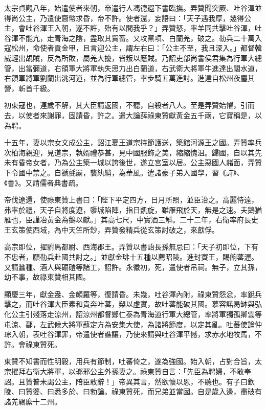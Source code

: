 \begin{pinyinscope}
 太宗貞觀八年，始遣使者來朝，帝遣行人馮德遐下書臨撫。弄贊聞突厥、吐谷渾並得尚公主，乃遣使齎幣求昏，帝不許。使者還，妄語曰：「天子遇我厚，幾得公主，會吐谷渾王入朝，遂不許，殆有以間我乎？」弄贊怒，率羊同共擊吐谷渾，吐谷渾不能亢，走青海之陰，盡取其貲畜。又攻黨項、白蘭羌，破之。勒兵二十萬入寇松州，命使者貢金甲，且言迎公主，謂左右曰：「公主不至，我且深入。」都督韓威輕出覘賊，反為所敗，屬羌大擾，皆叛以應賊。乃詔吏部尚書侯君集為行軍大總管，出當彌道，右領軍大將軍執失思力出白蘭道，右武衛大將軍牛進達出闊水道，右領軍將軍劉蘭出洮河道，並為行軍總管，率步騎五萬進討。進達自松州夜鏖其營，斬首千級。



 初東寇也，連歲不解，其大臣請返國，不聽，自殺者八人。至是弄贊始懼，引而去，以使者來謝罪，固請昏，許之。遣大論薛祿東贊獻黃金五千兩，它寶稱是，以為聘。



 十五年，妻以宗女文成公主，詔江夏王道宗持節護送，築館河源王之國。弄贊率兵次柏海親迎，見道宗，執婿禮恭甚，見中國服飾之美，縮縮愧沮。歸國，自以其先未有昏帝女者，乃為公主築一城以誇後世，遂立宮室以居。公主惡國人赭面，弄贊下令國中禁之。自褫氈罽，襲紈綃，為華風。遣諸豪子弟入國學，習《詩》、《書》。又請儒者典書疏。



 帝伐遼還，使祿東贊上書曰：「陛下平定四方，日月所照，並臣治之。高麗恃遠，弗率於禮，天子自將度遼，隳城陷陣，指日凱旋，雖雁飛於天，無是之速。夫鵝猶雁也，臣謹冶黃金為鵝以獻。」其高七尺，中實酒三斛。二十二年，右衛率府長史王玄策使西域，為中天竺所鈔，弄贊發精兵從玄策討破之，來獻俘。



 高宗即位，擢駙馬都尉、西海郡王。弄贊以書詒長孫無忌曰：「天子初即位，下有不忠者，願勒兵赴國共討之。」並獻金琲十五種以薦昭陵。進封賨王，賜餉蕃渥。又請蠶種、酒人與碾磑等諸工，詔許。永徽初，死，遣使者吊祠。無子，立其孫，幼不事，故祿東贊相其國。



 顯慶三年，獻金盎、金頗羅等，復請昏。未幾，吐谷渾內附，祿東贊怨忿，率銳兵擊之，而吐谷渾大臣素和貴奔吐蕃，槊以虛實，故吐蕃能破其國。慕容諾曷缽與弘化公主引殘落走涼州，詔涼州都督鄭仁泰為青海道行軍大總管，率將軍獨孤卿雲等屯涼、鄯，左武候大將軍蘇定方為安集大使，為諸將節度，以定其亂。吐蕃使論仲琮入朝，表吐谷渾罪，帝遣使者譙讓，乃使來請與吐谷渾平憾，求赤水地牧馬，不許。會祿東贊死。



 東贊不知書而性明毅，用兵有節制，吐蕃倚之，遂為強國。始入朝，占對合旨，太宗擢拜右衛大將軍，以瑯邪公主外孫妻之。祿東贊自言：「先臣為聘婦，不敢奉詔。且贊普未謁公主，陪臣敢辭！」帝異其言，然欲懷以恩，不聽也。有子曰欽陵、曰贊婆、曰悉多於、曰勃論。祿東贊死，而兄弟並當國。自是歲入邊，盡破有諸羌羈縻十二州。




\end{pinyinscope}
